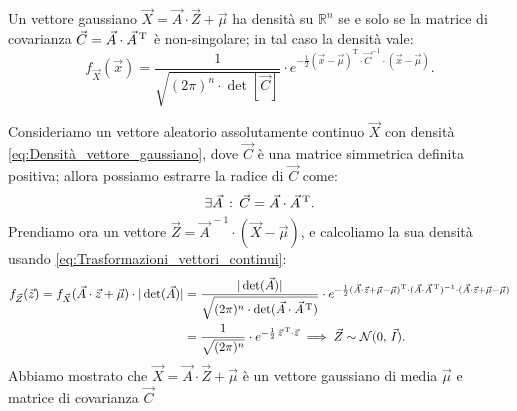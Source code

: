         \begin{prty}
            Un vettore gaussiano $\vec{X} = \vec{A} \cdot \vec{Z} + \vec{\mu}$ ha densità su $\mathbb{R}^n$ se e solo se la matrice di covarianza $\vec{C} = \vec{A} \cdot \vec{A}^{\text{\,T}}$ è non-singolare; in tal caso la densità vale:
            \begin{equation}\label{eq:Densità_vettore_gaussiano}
                f_{\vec{X}}(\vec{x}) = \frac{1}{\sqrt{(2\pi)^n \cdot \det[\vec{C}]}} \cdot e^{-\frac{1}{2}(\vec{x}-\vec{\mu})^{\text{T}} \cdot \vec{C}^{-1}\cdot (\vec{x}-\vec{\mu})}
            .\end{equation}
        \end{prty}
        \begin{obsv}
            Consideriamo un vettore aleatorio assolutamente continuo $\vec{X}$ con densità \eqref{eq:Densità_vettore_gaussiano}, dove $\vec{C}$ è una matrice simmetrica definita positiva; allora possiamo estrarre la radice di $\vec{C}$ come: \[
            \exists \vec{A} \,:\, \vec{C} = \vec{A} \cdot \vec{A}^{\text{\,T}}
        .\] Prendiamo ora un vettore $\vec{Z} = \vec{A}^{\,-1}\cdot(\vec{X} - \vec{\mu})$, e calcoliamo la sua densità usando \eqref{eq:Trasformazioni_vettori_continui}:
        \begin{align*}
            f_{\vec{Z}}(\vec{z}) = f_{\vec{X}}(\vec{A} \cdot \vec{z} + \vec{\mu}) \cdot |\det(\vec{A})| &=
            \frac{|\det(\vec{A})|}{\sqrt{(2\pi)^n \cdot \det(\vec{A} \cdot \vec{A}^{\text{\,T}})}} \cdot 
            e^{-\frac{1}{2}(\vec{A}\cdot \vec{z} + \vec{\mu}-\vec{\mu})^{\text{T}} \cdot (\vec{A} \cdot \vec{A}^{\text{\,T}})^{-1} \cdot (\vec{A}\cdot \vec{z} +\vec{\mu}-\vec{\mu})} \\
            &= \frac{1}{\sqrt{(2\pi)^n}} \cdot e^{-\frac{1}{2}\, \vec{z}^{\text{\,T}} \cdot \vec{z}}
            \implies \vec{Z} \sim \mathcal{N}(0,\,\vec{I})
        .\end{align*}
        Abbiamo mostrato che $\vec{X} = \vec{A} \cdot \vec{Z} + \vec{\mu}$ è un vettore gaussiano di media $\vec{\mu}$ e matrice di covarianza $\vec{C}$
        \end{obsv}
